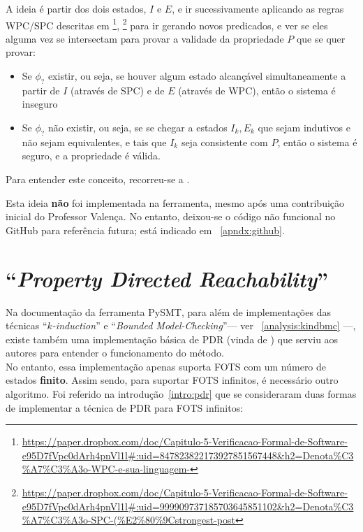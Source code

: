 \documentclass[11pt,a4paper]{report}%
\def\pdr{``\textit{Property Directed Reachability}''\xspace}
\def\bmc{``\textit{Bounded Model-Checking}''\xspace}
\def\kind{``\textit{$k$-induction}''\xspace}
\begin{document}
A ideia é partir dos dois estados, $I$ e $E$, e ir sucessivamente aplicando as
regras WPC/SPC descritas em \footnote{\url{https://paper.dropbox.com/doc/Capitulo-5-Verificacao-Formal-de-Software-e95D7fVpc0dArh4pnVl1l#:uid=847823822173927851567448&h2=Denota\%C3\%A7\%C3\%A3o-WPC-e-sua-linguagem-}},
\footnote{\url{https://paper.dropbox.com/doc/Capitulo-5-Verificacao-Formal-de-Software-e95D7fVpc0dArh4pnVl1l#:uid=999909737185703645851102&h2=Denota\%C3\%A7\%C3\%A3o-SPC-(\%E2\%80\%9Cstrongest-post}}
para ir gerando novos predicados, e ver se eles alguma vez se intersectam para provar
a validade da propriedade $P$ que se quer provar:

\begin{itemize}
    \item Se $\phi_?$ existir, ou seja, se houver algum estado alcançável simultaneamente
    a partir de $I$ (através de SPC) e de $E$ (através de WPC), então o sistema é inseguro
    \item Se $\phi_?$ não existir, ou seja, se se chegar a estados $I_k, E_k$ que sejam
    indutivos e não sejam equivalentes, e tais que $I_k$ seja consistente com $P$, então
    o sistema é seguro, e a propriedade é válida.
\end{itemize} 

Para entender este conceito, recorreu-se a \cite{interpolant_spc_wpc}.

Esta ideia \textbf{não} foi implementada na ferramenta, mesmo após uma contribuição inicial do
Professor Valença. No entanto, deixou-se o código não funcional no GitHub para
referência futura; está indicado em ~\ref{apndx:github}.

\section{\pdr}
\label{analysis:pdr}

Na documentação da ferramenta PySMT, para além de implementações das técnicas \kind e
\bmc --- ver ~\ref{analysis:kindbmc} ---, existe também uma implementação básica de PDR
(vinda de \cite{pdr_original}) que serviu aos autores para entender o funcionamento do método.\\

No entanto, essa implementação apenas suporta FOTS com um número de estados \textbf{finito}.
Assim sendo, para suportar FOTS infinitos, é necessário outro algoritmo.
Foi referido na introdução~\ref{intro:pdr} que se consideraram duas formas de implementar
a técnica de PDR para FOTS infinitos:
\end{document}
